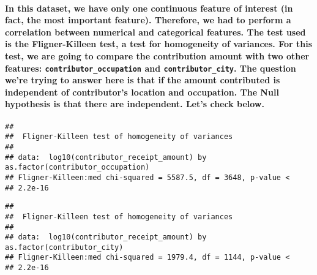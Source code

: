 \documentclass[]{article}
\let\oldparagraph\paragraph
\renewcommand{\paragraph}[1]{\oldparagraph{#1}\mbox{}}
\begin{document}
\paragraph{\texorpdfstring{In this dataset, we have only one continuous
feature of interest (in fact, the most important feature). Therefore, we
had to perform a correlation between numerical and categorical features.
The test used is the Fligner-Killeen test, a test for homogeneity of
variances. For this test, we are going to compare the contribution
amount with two other features: \texttt{contributor\_occupation} and
\texttt{contributor\_city}. The question we're trying to answer here is
that if the amount contributed is independent of contributor's location
and occupation. The Null hypothesis is that there are independent. Let's
check
below.}{In this dataset, we have only one continuous feature of interest (in fact, the most important feature). Therefore, we had to perform a correlation between numerical and categorical features. The test used is the Fligner-Killeen test, a test for homogeneity of variances. For this test, we are going to compare the contribution amount with two other features: contributor\_occupation and contributor\_city. The question we're trying to answer here is that if the amount contributed is independent of contributor's location and occupation. The Null hypothesis is that there are independent. Let's check below.}}\label{in-this-dataset-we-have-only-one-continuous-feature-of-interest-in-fact-the-most-important-feature.-therefore-we-had-to-perform-a-correlation-between-numerical-and-categorical-features.-the-test-used-is-the-fligner-killeen-test-a-test-for-homogeneity-of-variances.-for-this-test-we-are-going-to-compare-the-contribution-amount-with-two-other-features-contributor_occupation-and-contributor_city.-the-question-were-trying-to-answer-here-is-that-if-the-amount-contributed-is-independent-of-contributors-location-and-occupation.-the-null-hypothesis-is-that-there-are-independent.-lets-check-below.}

\begin{verbatim}
## 
##  Fligner-Killeen test of homogeneity of variances
## 
## data:  log10(contributor_receipt_amount) by as.factor(contributor_occupation)
## Fligner-Killeen:med chi-squared = 5587.5, df = 3648, p-value <
## 2.2e-16
\end{verbatim}

\begin{verbatim}
## 
##  Fligner-Killeen test of homogeneity of variances
## 
## data:  log10(contributor_receipt_amount) by as.factor(contributor_city)
## Fligner-Killeen:med chi-squared = 1979.4, df = 1144, p-value <
## 2.2e-16
\end{verbatim}
\end{document}
